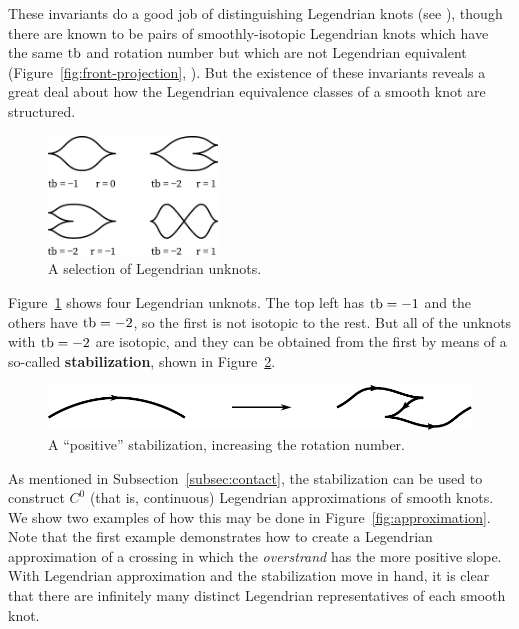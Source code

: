 These invariants do a good job of distinguishing Legendrian knots (see \cite{eliashberg2008unknot}), though there are known to be pairs of smoothly-isotopic Legendrian knots which have the same $\operatorname{tb}$ and rotation number but which are not Legendrian equivalent (Figure~\ref{fig:front-projection}, \cite{chekanov}). But the existence of these invariants reveals a great deal about how the Legendrian equivalence classes of a smooth knot are structured. 

\begin{figure}[ht]
    \centering
    \includegraphics[width=0.4\textwidth]{images/unknots.pdf}
    \caption{A selection of Legendrian unknots.}%
    \label{fig:unknots}
\end{figure}

Figure~\ref{fig:unknots} shows four Legendrian unknots. The top left has $\operatorname{tb} = -1$ and the others have $\operatorname{tb} = -2$, so the first is not isotopic to the rest. But all of the unknots with $\operatorname{tb} = -2$ are isotopic, and they can be obtained from the first by means of a so-called \textbf{stabilization}, shown in Figure~\ref{fig:stabilization}.

\begin{figure}[ht]
    \centering
    \includegraphics[width=0.5\linewidth]{images/stabilization.pdf}
    \caption{A ``positive'' stabilization, increasing the rotation number.}%
    \label{fig:stabilization}
\end{figure}

As mentioned in Subsection~\ref{subsec:contact}, the stabilization can be used to construct $C^0$ (that is, continuous) Legendrian approximations of smooth knots. We show two examples of how this may be done in Figure~\ref{fig:approximation}. Note that the first example demonstrates how to create a Legendrian approximation of a crossing in which the \emph{overstrand} has the more positive slope. With Legendrian approximation and the stabilization move in hand, it is clear that there are infinitely many distinct Legendrian representatives of each smooth knot.

